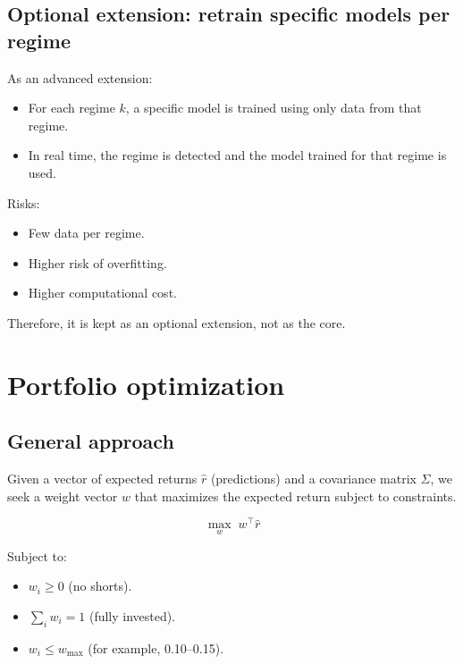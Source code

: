 \documentclass[12pt]{article}
\begin{document}
\subsection{Optional extension: retrain specific models per regime}

As an advanced extension:

\begin{itemize}
    \item For each regime $k$, a specific model is trained using only data from that regime.
    \item In real time, the regime is detected and the model trained for that regime is used.
\end{itemize}

Risks:

\begin{itemize}
    \item Few data per regime.
    \item Higher risk of overfitting.
    \item Higher computational cost.
\end{itemize}

Therefore, it is kept as an optional extension, not as the core.

\section{Portfolio optimization}

\subsection{General approach}

Given a vector of expected returns $\hat{r}$ (predictions) and a covariance matrix $\Sigma$, we seek a weight vector $w$ that maximizes the expected return subject to constraints.



\[
\max_w \; w^\top \hat{r}
\]



Subject to:

\begin{itemize}
    \item $w_i \ge 0$ (no shorts).
    \item $\sum_i w_i = 1$ (fully invested).
    \item $w_i \le w_{\max}$ (for example, 0.10--0.15).
\end{itemize}
\end{document}

